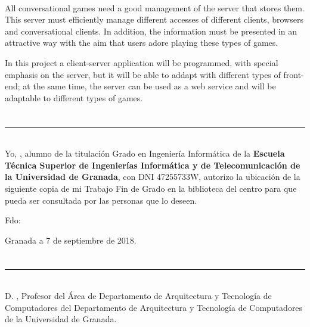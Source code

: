 \vspace{0.7cm}
\\

All conversational games need a good management of the server that stores them. This server must efficiently manage different accesses of different clients, browsers and conversational clients. In addition, the information must be presented in an attractive way with the aim that users adore playing these types of games.

In this project a client-server application will be programmed, with special emphasis on the server, but it will be able to addapt with different types of front-end; at the same time, the server can be used as a web service and will be adaptable to different types of games.
\chapter*{}
\thispagestyle{empty}

\noindent\rule[-1ex]{\textwidth}{2pt}\\[4.5ex]

Yo, \textbf{\myName}, alumno de la titulación Grado en Ingeniería Informática de la \textbf{Escuela Técnica Superior
de Ingenierías Informática y de Telecomunicación de la Universidad de Granada}, con DNI 47255733W, autorizo la
ubicación de la siguiente copia de mi Trabajo Fin de Grado en la biblioteca del centro para que pueda ser
consultada por las personas que lo deseen.

\vspace{6cm}

\noindent Fdo: \myName

\vspace{2cm}

\begin{flushright}
Granada a 7 de septiembre de 2018.
\end{flushright}


\chapter*{}
\thispagestyle{empty}

\noindent\rule[-1ex]{\textwidth}{2pt}\\[4.5ex]

D. \textbf{\myProf}, Profesor del Área de  Departamento de Arquitectura y Tecnología de Computadores del Departamento de Arquitectura y Tecnología de Computadores de la Universidad de Granada.

